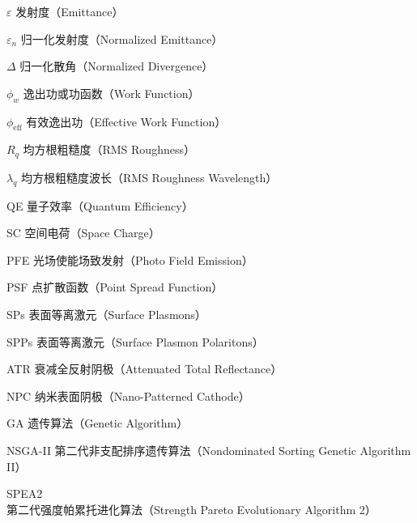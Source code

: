 \begin{denotation}[3cm]
\item[$\varepsilon$] 发射度（Emittance）
\item[$\varepsilon_n$] 归一化发射度（Normalized Emittance）
\item[$\Delta$] 归一化散角（Normalized Divergence）
\item[$\phi_w$] 逸出功或功函数（Work Function）
\item[$\phi_{\text{eff}}$] 有效逸出功（Effective Work Function）
\item[$R_q$] 均方根粗糙度（RMS Roughness）
\item[$\lambda_q$] 均方根粗糙度波长（RMS Roughness Wavelength）
\item[QE] 量子效率（Quantum Efficiency）
\item[SC] 空间电荷（Space Charge）
\item[PFE] 光场使能场致发射（Photo Field Emission）
\item[PSF] 点扩散函数（Point Spread Function）
\item[SPs] 表面等离激元（Surface Plasmons）
\item[SPPs] 表面等离激元（Surface Plasmon Polaritons）
\item[ATR] 衰减全反射阴极（Attenuated Total Reflectance）
\item[NPC] 纳米表面阴极（Nano-Patterned Cathode）
\item[GA] 遗传算法（Genetic Algorithm）
\item[NSGA-II] 第二代非支配排序遗传算法（Nondominated Sorting Genetic Algorithm II）
\item[SPEA2] 第二代强度帕累托进化算法（Strength Pareto Evolutionary Algorithm 2）
\end{denotation}
